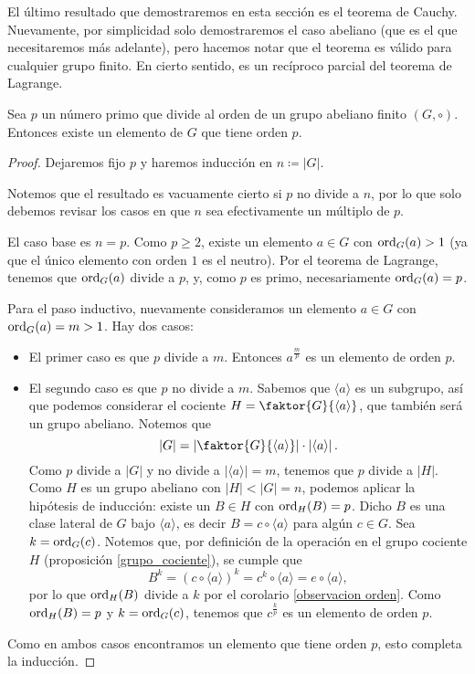 El último resultado que demostraremos en esta sección es el teorema de Cauchy. Nuevamente, por simplicidad solo demostraremos el caso abeliano (que es el que necesitaremos más adelante), pero hacemos notar que el teorema es válido para cualquier grupo finito. En cierto sentido, es un recíproco parcial del teorema de Lagrange.

\begin{theorem}\label{teo cauchy}
Sea $p$ un número primo que divide al orden de un grupo abeliano finito
$(G,\circ)$. Entonces existe un elemento de $G$ que tiene orden $p$.
\end{theorem}

\begin{proof}
Dejaremos fijo $p$ y haremos inducción en $n \coloneqq |G|$. 

Notemos que el resultado es vacuamente cierto si $p$ no divide a $n$, por lo que solo debemos revisar los casos en que $n$ sea efectivamente un múltiplo de $p$. 

El caso base es $n = p$. Como $p \geq 2$, existe un elemento $a \in G$ con $\mathrm{ord}_{G}(a) > 1$ (ya que el único elemento con orden $1$ es el neutro). Por el teorema de Lagrange, tenemos que $\mathrm{ord}_{G}(a)$ divide a $p$, y, como $p$ es primo, necesariamente $\mathrm{ord}_{G}(a) = p$.

Para el paso inductivo, nuevamente consideramos un elemento $a \in G$ con $\mathrm{ord}_{G}(a) = m > 1$. Hay dos casos:
\begin{itemize}
\item El primer caso es que $p$ divide a $m$. Entonces $a^{\frac{m}{p}}$ es un elemento de orden $p$.
\item El segundo caso es que $p$ no divide a $m$. Sabemos que $\langle a \rangle$ es un subgrupo, así que podemos considerar el cociente $H = \faktor{G}{\langle a \rangle}$, que también será un grupo abeliano. Notemos que
$$|G| = \left|\faktor{G}{\langle a \rangle}\right| \cdot \left|\langle a \rangle\right|.$$
Como $p$ divide a $|G|$ y no divide a $\left|\langle a \rangle\right| = m$, tenemos que $p$ divide a $|H|$. Como $H$ es un grupo abeliano con $|H| < |G| = n$, podemos aplicar la hipótesis de inducción: existe un $B \in H$ con $\mathrm{ord}_{H}(B) = p$. Dicho $B$ es una clase lateral de $G$ bajo $\langle a \rangle$, es decir $B = c \circ \langle a \rangle$ para algún $c \in G$. Sea $k = \mathrm{ord}_{G}(c)$. Notemos que, por definición de la operación en el grupo cociente $H$ (proposición \ref{grupo_cociente}), se cumple que
$$B^k = (c \circ \langle a \rangle)^k = c^k \circ \langle a \rangle = e \circ \langle a \rangle,$$
por lo que $\mathrm{ord}_{H}(B)$ divide a $k$ por el corolario \ref{observacion orden}. Como $\mathrm{ord}_{H}(B) = p$ y $k = \mathrm{ord}_{G}(c)$, tenemos que $c^{\frac{k}{p}}$ es un elemento de orden $p$.
\end{itemize}
Como en ambos casos encontramos un elemento que tiene orden $p$, esto completa la inducción.
\end{proof}


